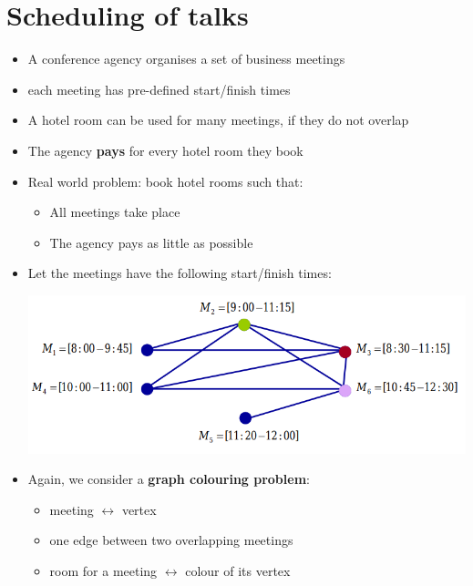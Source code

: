 \documentclass{article}[18pt]
\begin{document}
\section{Scheduling of talks}
\begin{itemize}
\item A conference agency organises a set of business meetings
\item each meeting has pre-defined start/finish times
\item A hotel room can be used for many meetings, if they do not overlap
\item The agency \textbf{pays} for every hotel room they book
\item Real world problem: book hotel rooms such that:
\begin{itemize}
\item All meetings take place
\item The agency pays as little as possible
\end{itemize}
\end{itemize}
\begin{itemize}
\item Let the meetings have the following start/finish times:
\begin{center}
\includegraphics[scale=0.7]{graph}
\end{center}
\item Again, we consider a \textbf{graph colouring problem}:
\begin{itemize}
\item meeting $\leftrightarrow$ vertex
\item one edge between two overlapping meetings
\item room for a meeting $\leftrightarrow$ colour of its vertex
\end{itemize}
\end{itemize}
\end{document}
